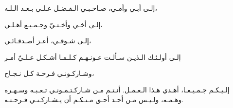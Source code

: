 \begin{center}
    {
        \Large\bfseries
    }
\end{center}

\begin{RLtext}
    إلـى أبـي وأمـي، صـاحـبـي الـفـضـل عـلـي بـعـد الـلـه،
    
    إلـى أخـي وأخـتـيّ وجـمـيـع أهـلـي،

    إلـى شـوقـي، أعـز أصـدقـائـي،
    
    إلـى أولـئـك الـذيـن سـألـت عـونـهـم كـلـمـا أشـكـل عـلـيّ أمـر
    
    وشـاركـونـي فـرحـة كـل نـجـاح،
    
    إلـيـكـم جـمـيـعـا، أهـدي هـذا الـعـمـل.
    أنـتـم مـن شـاركـتـمـونـي تـعـبـه وسـهـره وهـمـه،
    ولـيـس مـن أحـد أحـق مـنـكـم أن يـشـاركـنـي فـرحـتـه.
\end{RLtext}

\pagebreak